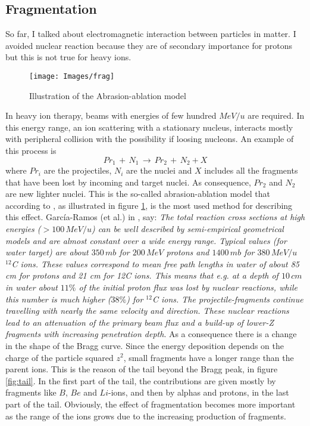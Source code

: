 \documentclass[12pt, a4paper, twoside]{book}
\begin{document}
\subsection{Fragmentation}
So far, I talked about electromagnetic interaction between particles in matter. I avoided nuclear reaction because they are of secondary importance for protons but this is not true for heavy ions.
\begin{figure}[!t]
{\texttt{[image: Images/frag]}}
\caption{Illustration of the Abrasion-ablation model}
\label{fig:frag}
\end{figure}
In heavy ion therapy, beams with energies of few hundred $MeV/u$ are required. In this energy range, an ion scattering with a stationary nucleus, interacts mostly with peripheral collision with the possibility if loosing nucleons.
An example of this process is
\[
Pr_1\,+\,N_1 \, \rightarrow\, Pr_2 \,+\, N_2 + X
\]
where $Pr_i$ are the projectiles, $N_i$ are the nuclei and $X$ includes all the fragments that have been lost by incoming and target nuclei. As consequence, $Pr_2$ and $N_2$ are new lighter nuclei.
This is the so-called abrasion-ablation model that according to \cite{serb:nucRea}, as illustrated in figure \ref{fig:frag}, is the most used method for describing this effect.
García-Ramos (et al.) in \cite{garc:nucu}, say: \emph{The total reaction cross sections at high energies ($>100\,MeV/u$) can be well described by semi-empirical geometrical models and are almost constant over a wide energy range. Typical values (for water target) are about $350\, mb$ for $200\,MeV$ protons and $1400\,mb$ for $380\,MeV/u$ $^{12}$C ions. These values correspond to mean free path lengths in water of about 85 cm for protons and 21 cm for 12C ions. This means that e.g. at a depth of $10\,cm$ in water about $11\%$ of the initial proton flux was lost by nuclear reactions, while this number is much higher ($38\%$) for $^{12}$C ions.
The projectile-fragments continue travelling with nearly the same velocity and direction. These nuclear reactions lead to an attenuation of the primary beam flux and a build-up of lower-Z fragments with increasing penetration depth}.
As a consequence there is a change in the shape of the Bragg curve. Since the energy deposition depends on the charge of the particle squared $z^2$, small fragments have a longer range than the parent ions. This is the reason of the tail beyond the Bragg peak, in figure \ref{fig:tail}. 
In the first part of the tail, the contributions are given mostly by fragments like $B$, $Be$ and $Li$-ions, and then by alphas and protons, in the last part of the tail.
Obviously, the effect of fragmentation becomes more important as the range of the ions grows due to the increasing production of fragments.
\end{document}

